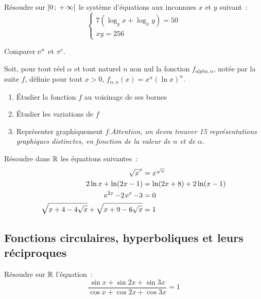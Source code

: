\begin{exercice}
  Résoudre sur \(\left] 0 \, ; {} +\infty \right[\) le système d'équations aux
  inconnues \(x\) et \(y\) suivant~:
  \begin{equation}
    \begin{cases} 7(\log_y x +\log_x y) = 50 \\ xy = 256 \end{cases}
  \end{equation}
\end{exercice}

\begin{exercice}
  Comparer \(\operatorname{e}^\pi\) et \(\pi^e\).
\end{exercice}

\begin{exercice}
  Soit, pour tout réel \(\alpha\) et tout naturel \(n\) non nul la fonction
  \(f_{alpha, n}\), notée par la suite \(f\), définie pour tout \(x>0\),
  \(f_{\alpha, n}(x) = x^\alpha {(\ln x)}^n \).
  \begin{enumerate}
    \item Étudier la fonction \(f\) au voisinage de ses bornes
    \item Étudier les variations de \(f\)
    \item Représenter graphiquement \(f\).\emph{Attention, on devra trouver 15
      représentations graphiques distinctes, en fonction de la valeur de \(n\)
      et de \(\alpha\).}
  \end{enumerate}
\end{exercice}

\begin{exercice}
  Résoudre dans \(\mathbb{R}\) les équations suivantes~:
  \begin{align*}
    {\sqrt{x}}^x &= x^{\sqrt{x}} \\
    2\ln x + \ln(2x-1) &= \ln(2x+8) + 2\ln(x-1) \\
    \operatorname{e}^{2x} -2\operatorname{e}^x-3 & = 0 \\
    \sqrt{x+4-4\sqrt{x}} + \sqrt{x+9-6\sqrt{x}} &= 1
  \end{align*}
\end{exercice}

\subsection{Fonctions circulaires, hyperboliques et leurs réciproques}

\begin{exercice}
  Résoudre sur \(\mathbb{R}\) l'équation~:
  \begin{equation}
    \frac{\sin x + \sin 2x + \sin 3x}{\cos x + \cos 2x + \cos 3x} = 1
  \end{equation}
\end{exercice}

